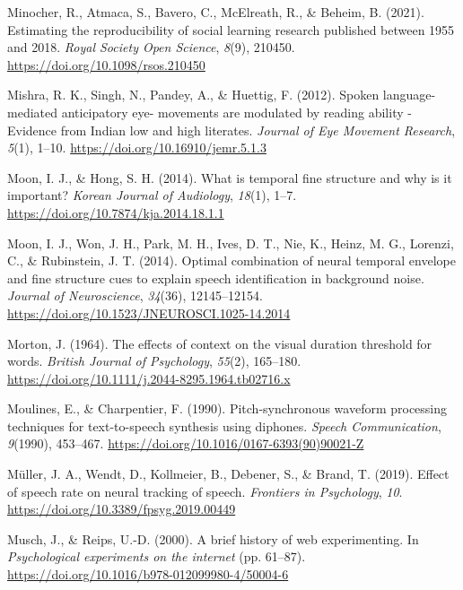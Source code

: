 \documentclass[a4paper, nobind]{templates/ociamthesis}
\newlength{\cslhangindent}
\newenvironment{CSLReferences}[2] %
 {%
  \setlength{\parindent}{0pt}
  \ifodd #1
  \let\oldpar\par
  \def\par{\hangindent=\cslhangindent\oldpar}
  \fi
  \setlength{\parskip}{1mm}
  \setlength{\baselineskip}{6mm}
 }%
 {}
\begin{document}
\begin{CSLReferences}{1}{0}
\leavevmode{}%
Minocher, R., Atmaca, S., Bavero, C., McElreath, R., \& Beheim, B. (2021). Estimating the reproducibility of social learning research published between 1955 and 2018. \emph{Royal Society Open Science}, \emph{8}(9), 210450. \url{https://doi.org/10.1098/rsos.210450}

\leavevmode{}%
Mishra, R. K., Singh, N., Pandey, A., \& Huettig, F. (2012). {Spoken language-mediated anticipatory eye- movements are modulated by reading ability - Evidence from Indian low and high literates}. \emph{Journal of Eye Movement Research}, \emph{5}(1), 1--10. \url{https://doi.org/10.16910/jemr.5.1.3}

\leavevmode{}%
Moon, I. J., \& Hong, S. H. (2014). What is temporal fine structure and why is it important? \emph{Korean Journal of Audiology}, \emph{18}(1), 1--7. \url{https://doi.org/10.7874/kja.2014.18.1.1}

\leavevmode{}%
Moon, I. J., Won, J. H., Park, M. H., Ives, D. T., Nie, K., Heinz, M. G., Lorenzi, C., \& Rubinstein, J. T. (2014). Optimal combination of neural temporal envelope and fine structure cues to explain speech identification in background noise. \emph{Journal of Neuroscience}, \emph{34}(36), 12145--12154. \url{https://doi.org/10.1523/JNEUROSCI.1025-14.2014}

\leavevmode{}%
Morton, J. (1964). {The effects of context on the visual duration threshold for words}. \emph{British Journal of Psychology}, \emph{55}(2), 165--180. \url{https://doi.org/10.1111/j.2044-8295.1964.tb02716.x}

\leavevmode{}%
Moulines, E., \& Charpentier, F. (1990). {Pitch-synchronous waveform processing techniques for text-to-speech synthesis using diphones}. \emph{Speech Communication}, \emph{9}(1990), 453--467. \url{https://doi.org/10.1016/0167-6393(90)90021-Z}

\leavevmode{}%
Müller, J. A., Wendt, D., Kollmeier, B., Debener, S., \& Brand, T. (2019). {Effect of speech rate on neural tracking of speech}. \emph{Frontiers in Psychology}, \emph{10}. \url{https://doi.org/10.3389/fpsyg.2019.00449}

\leavevmode{}%
Musch, J., \& Reips, U.-D. (2000). {A brief history of web experimenting}. In \emph{Psychological experiments on the internet} (pp. 61--87). \url{https://doi.org/10.1016/b978-012099980-4/50004-6}


\end{CSLReferences}
\end{document}
